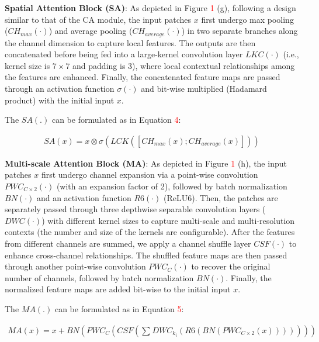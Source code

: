 \documentclass[10pt, a4paper, twocolumn]{article}
\begin{document}
\textbf{Spatial Attention Block (SA)}\cite{woo2018cbam}: As depicted in Figure \textcolor{red}{1} (g), following a design similar to that of the CA module, the input patches $x$ first undergo max pooling ($CH_{max}(\cdot)$) and average pooling ($CH_{average}(\cdot)$) in two separate branches along the channel dimension to capture local features. The outputs are then concatenated before being fed into a large-kernel convolution layer $LKC(\cdot)$ (i.e., kernel size is $7\times7$ and padding is 3), where local contextual relationships among the features are enhanced. Finally, the concatenated feature maps are passed through an activation function $\sigma(\cdot)$ and bit-wise multiplied (Hadamard product) with the initial input $x$.

The $SA(.)$ can be formulated as in Equation \textcolor{red}{4}:
\begin{scriptsize}   
\begin{align}
  SA(x) = x \otimes \sigma(LCK([CH_{max}(x); CH_{average}(x)]))
\end{align}
\end{scriptsize}

\textbf{Multi-scale Attention Block (MA)}: As depicted in Figure \textcolor{red}{1} (h), the input patches $x$ first undergo channel expansion via a point-wise convolution $PWC_{C\times 2}(\cdot)$ (with an expansion factor of 2), followed by batch normalization $BN(\cdot)$ and an activation function $R6(\cdot)$ (ReLU6\cite{howard2017mobilenets}). Then, the patches are separately passed through three depthwise separable convolution layers ($DWC(\cdot)$) with different kernel sizes to capture multi-scale and multi-resolution contexts (the number and size of the kernels are configurable). After the features from different channels are summed, we apply a channel shuffle layer\cite{zhang2018shufflenet} $CSF(\cdot)$ to enhance cross-channel relationships. The shuffled feature maps are then passed through another point-wise convolution $PWC_C(\cdot)$ to recover the original number of channels, followed by batch normalization $BN(\cdot)$. Finally, the normalized feature maps are added bit-wise to the initial input $x$.

The $MA(.)$ can be formulated as in Equation \textcolor{red}{5}:
\begin{scriptsize}   
\begin{align}
  MA(x)=x+BN(PWC_{C}(CSF(\sum_{}^{}DWC_{k_i}(R6(BN(PWC_{C\times2}(x)))))))
\end{align}
\end{scriptsize}
\end{document}
